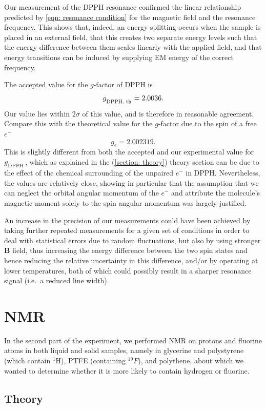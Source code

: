 \documentclass[a4paper]{jpconf}
\numberwithin{equation}{section}
\begin{document}
Our measurement of the DPPH resonance confirmed the linear relationship predicted by \eqref{eqn: resonance condition} for the magnetic field and the resonance frequency. This shows that, indeed, an energy splitting occurs when the sample is placed in an external field, that this creates two separate energy levels such that the energy difference between them scales linearly with the applied field, and that energy transitions can be induced by supplying EM energy of the correct frequency. 

The accepted value for the $g$-factor of DPPH is
\[
	g_{\textsubscript{DPPH, th}} = 2.0036.
\]
Our value lies within $2\sigma$ of this value, and is therefore in reasonable agreement.
Compare this with the theoretical value for the $g$-factor due to the spin of a free $e^-$
\[
	g_e = 2.002319.
\]
This is slightly different from both the accepted and our experimental value for $g_{\textsubscript{DPPH}}$, which as explained in the (\ref{section: theory}) theory section can be due to the effect of the chemical surrounding of the unpaired $e^-$ in DPPH. Nevertheless, the values are relatively close, showing in particular that the assumption that we can neglect the orbital angular momentum of the $e^-$ and attribute the molecule's magnetic moment solely to the spin angular momentum was largely justified.

An increase in the precision of our measurements could have been achieved by taking further repeated measurements for a given set of conditions in order to deal with statistical errors due to random fluctuations, but also by using stronger $\mathbf{B}$ field, thus increasing the energy difference between the two spin states and hence reducing the relative uncertainty in this difference, and/or by operating at lower temperatures, both of which could possibly result in a sharper resonance signal (i.e.\ a reduced line width).


\section{NMR} 
In the second part of the experiment, we performed NMR on protons and fluorine atoms in both liquid and solid samples, namely in glycerine and polystyrene (which contain ${}^1$H), PTFE (containing ${}^{19}F$), and polythene, about which we wanted to determine whether it is more likely to contain hydrogen or fluorine.
\subsection{Theory}
\end{document}
